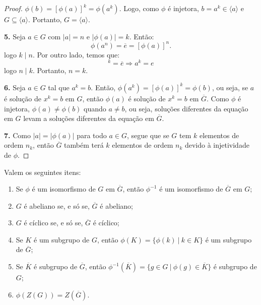 \begin{proof}
		$\phi(b) = [\phi(a)]^k = \phi(a^k)$. Logo, como $\phi$ é
		injetora, $b = a^k\in\langle a\rangle $ e 
		$G \subseteq \langle a\rangle$. Portanto, $G = \langle a\rangle$.
		\par\vspace{0.4cm}
		\textbf{5.} Seja $a\in G$ com $|a| = n$ e $|\phi(a)| = k$. Então:
		\begin{equation*}
		    \phi(a^n) = \overline{e} = [\phi(a)]^n.
		\end{equation*}
		logo $k\mid n$.	Por outro lado, temos que:
		\begin{equation*}
		    [\phi(a)]^k = \overline{e} \Rightarrow a^k = e
		\end{equation*}
		logo $n\mid k$. Portanto, $n = k$.
		\par\vspace{0.4cm}
		\textbf{6.} Seja $a \in G$ tal que $a^k = b$. Então, 
		$\phi(a^k) = [\phi(a)]^k = \phi(b)$, ou seja, se $a$ é 
		solução de $x^k = b$ em $G$, então $\phi(a)$ é solução de 
		$x^k = b$ em $\overline{G}$. Como $\phi$ é injetora,
		$\phi(a)\neq\phi(b)$ quando $a\neq b$, ou seja, soluções
		diferentes da equação em $G$ levam a soluções diferentes da
		equação em $\overline{G}$.
		\par\vspace{0.4cm}
		\textbf{7.} Como $|a| = |\phi(a)|$ para todo $a\in G$, segue que 
		se $G$ tem $k$ elementos de ordem $n_k$, então $\overline{G}$
		também terá $k$ elementos de ordem $n_k$ devido à injetividade 
		de $\phi$.	
	\end{proof}
	\begin{theorem}
	\label{isomorfismos em grupos}
	    Valem os seguintes itens:
		\begin{enumerate}
			\item Se $\phi$ é um isomorfismo de $G$ em $\overline{G}$,
			então $\phi ^{-1}$ é um isomorfismo de $\overline{G}$ em $G$;
			\item $G$ é abeliano se, e só se, $\overline{G}$ é abeliano;
			\item $G$ é cíclico se, e só se, $\overline{G}$ é cíclico;
			\item Se $K$ é um subgrupo de $G$, então 
			$\phi(K) = \{\phi(k) \ | \ k\in K\}$ é um subgrupo de
			$\overline{G}$;
			\item Se $\overline{K}$ é subgrupo de $\overline{G}$, 
			então $\phi^{-1}(\overline{K}) 
			= \{ g\in G \ | \ \phi(g)\in\overline{K}\}$ é subgrupo de $G$;
			\item $\phi(Z(G)) = Z(\overline{G})$.
		\end{enumerate}
	\end{theorem}

